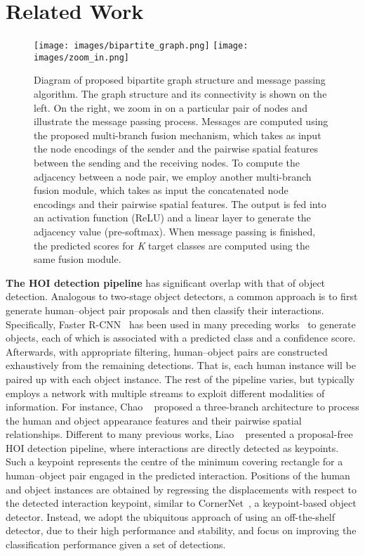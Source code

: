 \documentclass[10pt,twocolumn,letterpaper]{article}
\begin{document}
\section{Related Work}

\begin{figure*}[t]\centering
	\texttt{[image: images/bipartite\_graph.png]}
    \texttt{[image: images/zoom\_in.png]}
    \caption{Diagram of proposed bipartite graph structure and message passing algorithm. The graph structure and its connectivity is shown on the left. On the right, we zoom in on a particular pair of nodes and illustrate the message passing process. Messages are computed using the proposed multi-branch fusion mechanism, which takes as input the node encodings of the sender and the pairwise spatial features between the sending and the receiving nodes. To compute the adjacency between a node pair, we employ another multi-branch fusion module, which takes as input the concatenated node encodings and their pairwise spatial features. The output is fed into an activation function (ReLU) and a linear layer to generate the adjacency value (pre-softmax). When message passing is finished, the predicted scores for \textit{K} target classes are computed using the same fusion module.
}
   \label{fig:pipeline}
\end{figure*}

\textbf{The HOI detection pipeline} has significant overlap with that of object detection. Analogous to two-stage object detectors, a common approach is to first generate human--object pair proposals and then classify their interactions. Specifically, Faster R-CNN~\cite{ren2015} has been used in many preceding works~\cite{chao2018, gao2018, gupta2019, li2019, qi2018, peyre2019, ulutan2020, gao2020, wang2020,hou2020,li2020} to generate objects, each of which is associated with a predicted class and a confidence score. Afterwards, with appropriate filtering, human--object pairs are constructed exhaustively from the remaining detections. That is, each human instance will be paired up with each object instance. The rest of the pipeline varies, but typically employs a network with multiple streams to exploit different modalities of information. For instance, Chao \etal~\cite{chao2018} proposed a three-branch architecture to process the human and object appearance features and their pairwise spatial relationships. Different to many previous works, Liao \etal~\cite{liao2020} presented a proposal-free HOI detection pipeline, where interactions are directly detected as keypoints. Such a keypoint represents the centre of the minimum covering rectangle for a human--object pair engaged in the predicted interaction. Positions of the human and object instances are obtained by regressing the displacements with respect to the detected interaction keypoint, similar to CornerNet~\cite{law2018}, a keypoint-based object detector. Instead, we adopt the ubiquitous approach of using an off-the-shelf detector, due to their high performance and stability, and focus on improving the classification performance given a set of detections.
\end{document}
